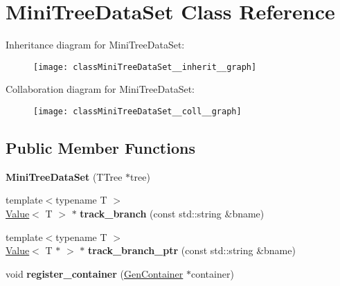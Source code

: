 \hypertarget{classMiniTreeDataSet}{}\section{Mini\+Tree\+Data\+Set Class Reference}
\label{classMiniTreeDataSet}


Inheritance diagram for Mini\+Tree\+Data\+Set\+:
\nopagebreak
\begin{figure}[H]
\begin{center}
\leavevmode
\texttt{[image: classMiniTreeDataSet\_\_inherit\_\_graph]}
\end{center}
\end{figure}


Collaboration diagram for Mini\+Tree\+Data\+Set\+:
\nopagebreak
\begin{figure}[H]
\begin{center}
\leavevmode
\texttt{[image: classMiniTreeDataSet\_\_coll\_\_graph]}
\end{center}
\end{figure}
\subsection*{Public Member Functions}
\begin{DoxyCompactItemize}
\item 
\hypertarget{classMiniTreeDataSet_adda06e23b0ed2562aad0b08990ba96f0}{}\label{classMiniTreeDataSet_adda06e23b0ed2562aad0b08990ba96f0} 
{\bfseries Mini\+Tree\+Data\+Set} (T\+Tree $\ast$tree)
\item 
\hypertarget{classMiniTreeDataSet_a63a623358d672b74257366773ff386ba}{}\label{classMiniTreeDataSet_a63a623358d672b74257366773ff386ba} 
{\footnotesize template$<$typename T $>$ }\\\hyperlink{classfilval_1_1Value}{Value}$<$ T $>$ $\ast$ {\bfseries track\+\_\+branch} (const std\+::string \&bname)
\item 
\hypertarget{classMiniTreeDataSet_a4cc84801f13b2ada59a4c7955a993eff}{}\label{classMiniTreeDataSet_a4cc84801f13b2ada59a4c7955a993eff} 
{\footnotesize template$<$typename T $>$ }\\\hyperlink{classfilval_1_1Value}{Value}$<$ T $\ast$ $>$ $\ast$ {\bfseries track\+\_\+branch\+\_\+ptr} (const std\+::string \&bname)
\item 
\hypertarget{classMiniTreeDataSet_ad15740937d695f59cd8028fa473030fb}{}\label{classMiniTreeDataSet_ad15740937d695f59cd8028fa473030fb} 
void {\bfseries register\+\_\+container} (\hyperlink{classfilval_1_1GenContainer}{Gen\+Container} $\ast$container)
\end{DoxyCompactItemize}
